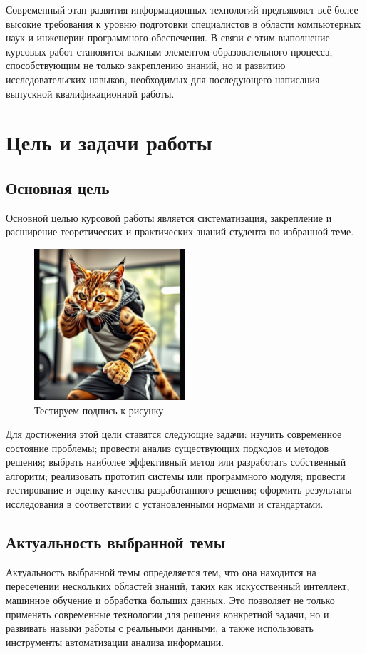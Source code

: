 \documentclass{HSECourseW}
\begin{document}
Современный этап развития информационных технологий предъявляет всё более высокие требования к уровню подготовки специалистов в области компьютерных наук и инженерии программного обеспечения. В связи с этим выполнение курсовых работ становится важным элементом образовательного процесса, способствующим не только закреплению знаний, но и развитию исследовательских навыков, необходимых для последующего написания выпускной квалификационной работы. 

\section{Цель и задачи работы}  

\subsection{Основная цель}
Основной целью курсовой работы является систематизация, закрепление и расширение теоретических и практических знаний студента по избранной теме.
\begin{figure}[htbp]
	\centering %
	\includegraphics[width=0.5\textwidth]{sportcat.png} %
	\caption{Тестируем подпись к рисунку} %
	\label{fig:sportcat} %
\end{figure}
Для достижения этой цели ставятся следующие задачи: изучить современное состояние проблемы; провести анализ существующих подходов и методов решения; выбрать наиболее эффективный метод или разработать собственный алгоритм; реализовать прототип системы или программного модуля; провести тестирование и оценку качества разработанного решения; оформить результаты исследования в соответствии с установленными нормами и стандартами. 

\subsection{Актуальность выбранной темы}
Актуальность выбранной темы определяется тем, что она находится на пересечении нескольких областей знаний, таких как искусственный интеллект, машинное обучение и обработка больших данных. Это позволяет не только применять современные технологии для решения конкретной задачи, но и развивать навыки работы с реальными данными, а также использовать инструменты автоматизации анализа информации. 
\end{document}
